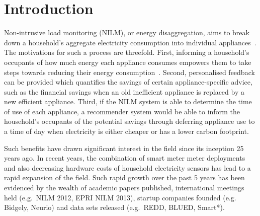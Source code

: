 \documentclass{sig-alternate}
\begin{document}
\section{Introduction}

\noindent
Non-intrusive load monitoring (NILM), or energy disaggregation, aims to break down a household's aggregate electricity consumption into individual appliances~\cite{hart_1992}. The motivations for such a process are threefold. First, informing a household's occupants of how much energy each appliance consumes empowers them to take steps towards reducing their energy consumption~\cite{darby_2006}. Second, personalised feedback can be provided which quantifies the savings of certain appliance-specific advice, such as the financial savings when an old inefficient appliance is replaced by a new efficient appliance. Third, if the NILM system is able to determine the time of use of each appliance, a recommender system would be able to inform the household's occupants of the potential savings through deferring appliance use to a time of day when electricity is either cheaper or has a lower carbon footprint. %

Such benefits have drawn significant interest in the field since its inception 25 years ago. In recent years, the combination of smart meter meter deployments~\cite{CaliforniaPublicUtilitiesCommission2006,DepartmentofEnergy&ClimateChange2013} and also decreasing hardware costs of household electricity sensors has lead to a rapid expansion of the field. Such rapid growth over the past 5 years has been evidenced by the wealth of academic papers published, international meetings held (e.g.\ NILM 2012, EPRI NILM 2013), startup companies founded (e.g. Bidgely, Neurio) and data sets released (e.g.\ REDD, BLUED, Smart*).
\end{document}
